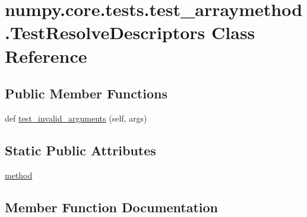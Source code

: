 \hypertarget{classnumpy_1_1core_1_1tests_1_1test__arraymethod_1_1TestResolveDescriptors}{}\section{numpy.\+core.\+tests.\+test\+\_\+arraymethod.\+Test\+Resolve\+Descriptors Class Reference}
\label{classnumpy_1_1core_1_1tests_1_1test__arraymethod_1_1TestResolveDescriptors}
\subsection*{Public Member Functions}
\begin{DoxyCompactItemize}
\item 
def \hyperlink{classnumpy_1_1core_1_1tests_1_1test__arraymethod_1_1TestResolveDescriptors_a3cb508a927e59414f14d5031da4f000e}{test\+\_\+invalid\+\_\+arguments} (self, args)
\end{DoxyCompactItemize}
\subsection*{Static Public Attributes}
\begin{DoxyCompactItemize}
\item 
\hyperlink{classnumpy_1_1core_1_1tests_1_1test__arraymethod_1_1TestResolveDescriptors_a3831c68922479562356b07880cc7362a}{method}
\end{DoxyCompactItemize}


\subsection{Member Function Documentation}
\mbox{\label{classnumpy_1_1core_1_1tests_1_1test__arraymethod_1_1TestResolveDescriptors_a3cb508a927e59414f14d5031da4f000e}} 
